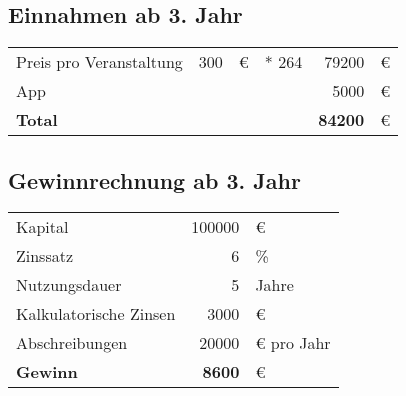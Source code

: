 %
%

\subsection{Einnahmen ab 3. Jahr}

\begin{table}[H]

    \begin{tabular}{l r l r r l}
        Preis pro Veranstaltung & 300       & €   &* 264 & 79200 & €\\
        App                     &           &    & & 5000  & €\\
        \midrule
        \textbf{Total}          &           &  &  & \textbf{84200}  & €
    \end{tabular}
    \label{tab:einnahmen}
\end{table}


\subsection{Gewinnrechnung ab 3. Jahr}

\begin{table}[H]
    \begin{tabular}{l r l}
        Kapital                 & 100000    & €\\
        Zinssatz                & 6         & \%\\
        Nutzungsdauer           & 5         & Jahre\\
        \midrule
        Kalkulatorische Zinsen & 3000 & €\\
        Abschreibungen & 20000 & € pro Jahr\\
        \midrule
        \textbf{Gewinn}         & \textbf{8600}  & €
    \end{tabular}
    \label{tab:bla}
\end{table}


